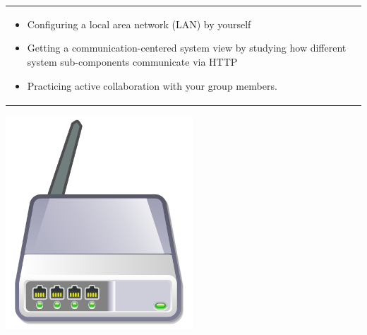 \documentclass{article}
\begin{document}
\vspace{.1cm}
\begin{center}
\begin{tabular}{l}
\toprule[1.5pt]
\parbox{0.8\linewidth}{
\vspace{.2cm}{\Large Learning goals:}
\begin{itemize}
    \item Configuring a local area network (LAN) by yourself
    \item Getting a communication-centered system view by studying how different system sub-components communicate via HTTP
    \item Practicing active collaboration with your group members.
\end{itemize}}\\
\bottomrule[1.5pt]
\end{tabular}
\end{center}
\vfill
\begin{center}
\includegraphics[width=70mm]{router.png}
\end{center}
\end{document}
